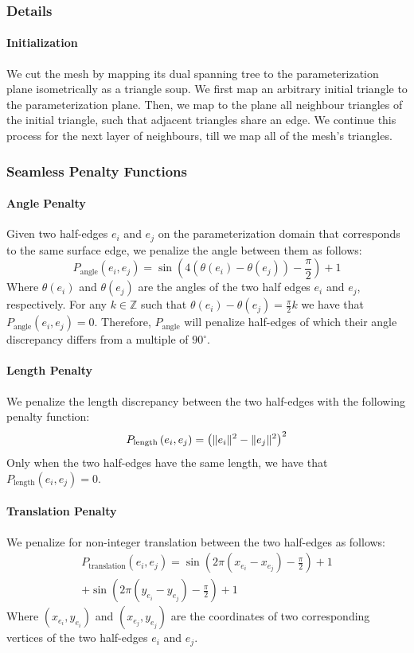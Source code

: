 \subsubsection{Details}
\paragraph{Initialization}
We cut the mesh by mapping its dual spanning tree to the parameterization plane isometrically as a triangle soup. We first map an arbitrary initial triangle to the parameterization plane. Then, we map to the plane all neighbour triangles of the initial triangle, such that adjacent triangles share an edge. We continue this process for the next layer of neighbours, till we map all of the mesh's triangles.
\subsubsection{Seamless Penalty Functions}
\paragraph{Angle Penalty}
Given two half-edges $e_i$ and $e_j$ on the parameterization domain that corresponds to the same surface edge, we penalize the angle between them as follows: 
$$P_{\mathrm{angle}}\left(e_i,e_j\right) = \sin\left(4\left(\theta(e_i) - \theta(e_j) \right) - \frac{\pi}{2} \right) + 1$$
Where $\theta(e_i)$ and $\theta(e_j)$ are the angles of the two half edges $e_i$ and $e_j$, respectively. For any $k \in \mathbb{Z}$ such that $\theta(e_i) - \theta(e_j) = \frac{\pi}{2}k$ we have that $P_{\mathrm{angle}}\left(e_i,e_j\right) = 0$. Therefore, $P_{\mathrm{angle}}$ will penalize half-edges of which their angle discrepancy differs from a multiple of $90^\circ$.
\paragraph{Length Penalty}
We penalize the length discrepancy between the two half-edges with the following penalty function:
$$P_{\mathrm{length}}\left(e_i,e_j\right) = \left( \lVert e_i\rVert^2 - \lVert e_j\rVert^2 \right)^2$$
Only when the two half-edges have the same length, we have that $P_{\mathrm{length}}\left(e_i,e_j\right) = 0$.
\paragraph{Translation Penalty}
We penalize for non-integer translation between the two half-edges as follows:
\begin{multline}
P_{\mathrm{translation}}\left(e_i,e_j\right) = \sin\left(2\pi\left(x_{e_i} - x_{e_j}\right) - \frac{\pi}{2} \right) + 1 \\ + \sin\left(2\pi\left(y_{e_i} - y_{e_j}\right) - \frac{\pi}{2} \right) + 1 \nonumber
\end{multline}
Where $\left(x_{e_i}, y_{e_i}\right)$ and $\left(x_{e_j}, y_{e_j}\right)$ are the coordinates of two corresponding vertices of the two half-edges $e_i$ and $e_j$.
